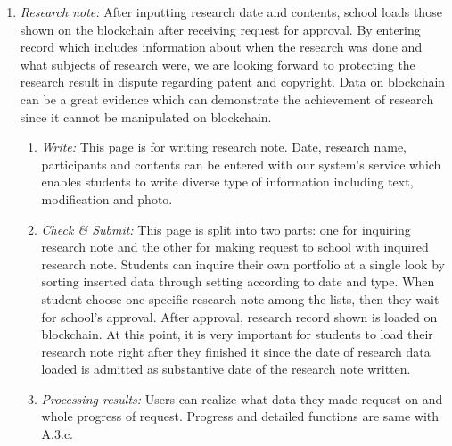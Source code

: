 \documentclass[conference]{IEEEtran}
\begin{document}
\begin{enumerate}
       \item \textit {Research note:} After inputting research date and contents, school loads those shown on the blockchain after receiving request for approval. By entering record which includes information about when the research was done and what subjects of research were, we are looking forward to protecting the research result in dispute regarding patent and copyright. Data on blockchain can be a great evidence which can demonstrate the achievement of research since it cannot be manipulated on blockchain.\\
    \begin{enumerate}
    	\item  \textit{Write:} This page is for writing research note. Date, research name, participants and contents can be entered with our system’s service which enables students to write diverse type of information including text, modification and photo. \\
        \item \textit{Check \& Submit:} This page is split into two parts: one for inquiring research note and the other for making request to school with inquired research note. Students can inquire their own portfolio at a single look by sorting inserted data through setting according to date and type. When student choose one specific research note among the lists, then they wait for school’s approval. After approval, research record shown is loaded on blockchain. At this point, it is very important for students to load their research note right after they finished it since the date of research data loaded is admitted as substantive date of the research note written.\\
        \item \textit{Processing results:} Users can realize what data they made request on and whole progress of request. Progress and detailed functions are same with A.3.c.\\
    \end{enumerate}
    

\end{enumerate}
\end{document}
